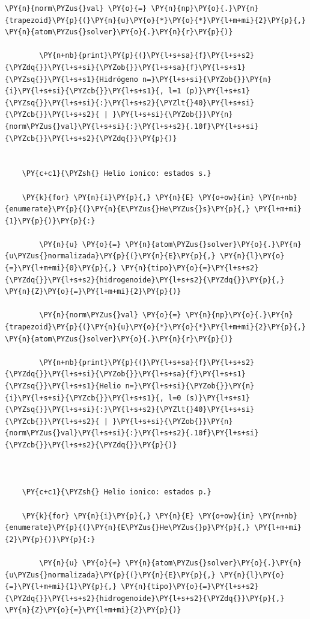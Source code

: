 \documentclass[11pt]{article}
\makeatletter
\def\PY@reset{\let\PY@it=\relax \let\PY@bf=\relax \let\PY@ul=\relax \let\PY@tc=\relax \let\PY@bc=\relax \let\PY@ff=\relax}
\def\PY@tok#1{\csname PY@tok@#1\endcsname}
\def\PY@toks#1+{\ifx\relax#1\empty\else \PY@tok{#1}\expandafter\PY@toks\fi}
\def\PY@do#1{\PY@bc{\PY@tc{\PY@ul{\PY@it{\PY@bf{\PY@ff{#1}}}}}}}
\def\PY#1#2{\PY@reset\PY@toks#1+\relax+\PY@do{#2}}
\makeatother
\begin{document}
\begin{tcolorbox}[breakable, size=fbox, boxrule=1pt, pad at break*=1mm,colback=cellbackground, colframe=cellborder]
\begin{Verbatim}[commandchars=\\\{\}]
        \PY{n}{norm\PYZus{}val} \PY{o}{=} \PY{n}{np}\PY{o}{.}\PY{n}{trapezoid}\PY{p}{(}\PY{n}{u}\PY{o}{*}\PY{o}{*}\PY{l+m+mi}{2}\PY{p}{,} \PY{n}{atom\PYZus{}solver}\PY{o}{.}\PY{n}{r}\PY{p}{)}

        \PY{n+nb}{print}\PY{p}{(}\PY{l+s+sa}{f}\PY{l+s+s2}{\PYZdq{}}\PY{l+s+si}{\PYZob{}}\PY{l+s+sa}{f}\PY{l+s+s1}{\PYZsq{}}\PY{l+s+s1}{Hidrógeno n=}\PY{l+s+si}{\PYZob{}}\PY{n}{i}\PY{l+s+si}{\PYZcb{}}\PY{l+s+s1}{, l=1 (p)}\PY{l+s+s1}{\PYZsq{}}\PY{l+s+si}{:}\PY{l+s+s2}{\PYZlt{}40}\PY{l+s+si}{\PYZcb{}}\PY{l+s+s2}{ | }\PY{l+s+si}{\PYZob{}}\PY{n}{norm\PYZus{}val}\PY{l+s+si}{:}\PY{l+s+s2}{.10f}\PY{l+s+si}{\PYZcb{}}\PY{l+s+s2}{\PYZdq{}}\PY{p}{)}


    \PY{c+c1}{\PYZsh{} Helio ionico: estados s.}

    \PY{k}{for} \PY{n}{i}\PY{p}{,} \PY{n}{E} \PY{o+ow}{in} \PY{n+nb}{enumerate}\PY{p}{(}\PY{n}{E\PYZus{}He\PYZus{}s}\PY{p}{,} \PY{l+m+mi}{1}\PY{p}{)}\PY{p}{:}

        \PY{n}{u} \PY{o}{=} \PY{n}{atom\PYZus{}solver}\PY{o}{.}\PY{n}{u\PYZus{}normalizada}\PY{p}{(}\PY{n}{E}\PY{p}{,} \PY{n}{l}\PY{o}{=}\PY{l+m+mi}{0}\PY{p}{,} \PY{n}{tipo}\PY{o}{=}\PY{l+s+s2}{\PYZdq{}}\PY{l+s+s2}{hidrogenoide}\PY{l+s+s2}{\PYZdq{}}\PY{p}{,} \PY{n}{Z}\PY{o}{=}\PY{l+m+mi}{2}\PY{p}{)}

        \PY{n}{norm\PYZus{}val} \PY{o}{=} \PY{n}{np}\PY{o}{.}\PY{n}{trapezoid}\PY{p}{(}\PY{n}{u}\PY{o}{*}\PY{o}{*}\PY{l+m+mi}{2}\PY{p}{,} \PY{n}{atom\PYZus{}solver}\PY{o}{.}\PY{n}{r}\PY{p}{)}

        \PY{n+nb}{print}\PY{p}{(}\PY{l+s+sa}{f}\PY{l+s+s2}{\PYZdq{}}\PY{l+s+si}{\PYZob{}}\PY{l+s+sa}{f}\PY{l+s+s1}{\PYZsq{}}\PY{l+s+s1}{Helio n=}\PY{l+s+si}{\PYZob{}}\PY{n}{i}\PY{l+s+si}{\PYZcb{}}\PY{l+s+s1}{, l=0 (s)}\PY{l+s+s1}{\PYZsq{}}\PY{l+s+si}{:}\PY{l+s+s2}{\PYZlt{}40}\PY{l+s+si}{\PYZcb{}}\PY{l+s+s2}{ | }\PY{l+s+si}{\PYZob{}}\PY{n}{norm\PYZus{}val}\PY{l+s+si}{:}\PY{l+s+s2}{.10f}\PY{l+s+si}{\PYZcb{}}\PY{l+s+s2}{\PYZdq{}}\PY{p}{)}

        

    \PY{c+c1}{\PYZsh{} Helio ionico: estados p.}

    \PY{k}{for} \PY{n}{i}\PY{p}{,} \PY{n}{E} \PY{o+ow}{in} \PY{n+nb}{enumerate}\PY{p}{(}\PY{n}{E\PYZus{}He\PYZus{}p}\PY{p}{,} \PY{l+m+mi}{2}\PY{p}{)}\PY{p}{:}

        \PY{n}{u} \PY{o}{=} \PY{n}{atom\PYZus{}solver}\PY{o}{.}\PY{n}{u\PYZus{}normalizada}\PY{p}{(}\PY{n}{E}\PY{p}{,} \PY{n}{l}\PY{o}{=}\PY{l+m+mi}{1}\PY{p}{,} \PY{n}{tipo}\PY{o}{=}\PY{l+s+s2}{\PYZdq{}}\PY{l+s+s2}{hidrogenoide}\PY{l+s+s2}{\PYZdq{}}\PY{p}{,} \PY{n}{Z}\PY{o}{=}\PY{l+m+mi}{2}\PY{p}{)}


\end{Verbatim}
\end{tcolorbox}
\end{document}
